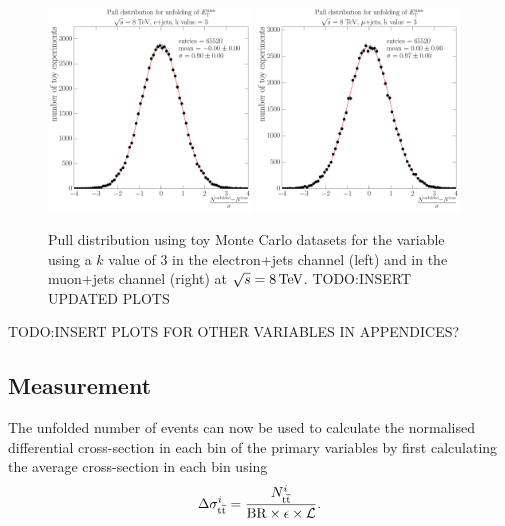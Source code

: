 \begin{figure}[hbtp]
    \centering
     \includegraphics[width=0.48\textwidth]{Chapters/04_Analysis/04b_XSections/images/unfolding_pulls/8TeV/MET/electron/kv3/pull_from_files_all_bins_stats_65520.pdf}\hfill
     \includegraphics[width=0.48\textwidth]{Chapters/04_Analysis/04b_XSections/images/unfolding_pulls/8TeV/MET/muon/kv3/pull_from_files_all_bins_stats_65520.pdf}\\
	 \caption{Pull distribution using toy Monte Carlo datasets for the \met variable using a $k$ value of 3 in
	 the electron+jets channel (left) and in the muon+jets channel (right) at $\sqrt{s}=8\,\text{Te\hspace{-.08em}V}$.
	 TODO:INSERT UPDATED PLOTS} %
     \label{fig:unfolding_pull_tests}
\end{figure}

TODO:INSERT PLOTS FOR OTHER VARIABLES IN APPENDICES?

\subsection{Measurement}
\label{ss:measurement}

The unfolded number of \ttbar events can now be used to calculate the normalised differential cross-section in
each bin of the primary variables by first calculating the average cross-section in each bin using
\begin{equation}
\label{eq:finll_1}
\Delta\sigma_{\mathrm{t}\overline{\mathrm{t}}}^i = \frac{N_{\mathrm{t}\overline{\mathrm{t}}}^i}{\mathrm{BR} \times \epsilon \times {\cal L}}. 
\end{equation}


